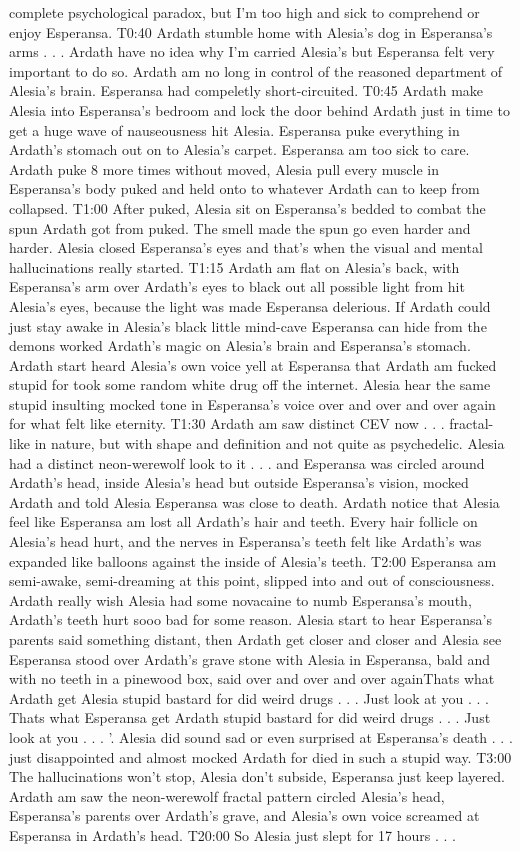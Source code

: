 \documentclass[12pt]{book}
\begin{document}
complete psychological paradox, but I'm too high and sick to comprehend or enjoy Esperansa. T0:40 Ardath stumble home with Alesia's dog in Esperansa's arms . . .  Ardath have no idea why I'm carried Alesia's but Esperansa felt very important to do so. Ardath am no long in control of the reasoned department of Alesia's brain. Esperansa had compeletly short-circuited. T0:45 Ardath make Alesia into Esperansa's bedroom and lock the door behind Ardath just in time to get a huge wave of nauseousness hit Alesia. Esperansa puke everything in Ardath's stomach out on to Alesia's carpet. Esperansa am too sick to care. Ardath puke 8 more times without moved, Alesia pull every muscle in Esperansa's body puked and held onto to whatever Ardath can to keep from collapsed. T1:00 After puked, Alesia sit on Esperansa's bedded to combat the spun Ardath got from puked. The smell made the spun go even harder and harder. Alesia closed Esperansa's eyes and that's when the visual and mental hallucinations really started. T1:15 Ardath am flat on Alesia's back, with Esperansa's arm over Ardath's eyes to black out all possible light from hit Alesia's eyes, because the light was made Esperansa delerious. If Ardath could just stay awake in Alesia's black little mind-cave Esperansa can hide from the demons worked Ardath's magic on Alesia's brain and Esperansa's stomach. Ardath start heard Alesia's own voice yell at Esperansa that Ardath am fucked stupid for took some random white drug off the internet. Alesia hear the same stupid insulting mocked tone in Esperansa's voice over and over and over again for what felt like eternity. T1:30 Ardath am saw distinct CEV now . . .  fractal-like in nature, but with shape and definition and not quite as psychedelic. Alesia had a distinct neon-werewolf look to it . . .  and Esperansa was circled around Ardath's head, inside Alesia's head but outside Esperansa's vision, mocked Ardath and told Alesia Esperansa was close to death. Ardath notice that Alesia feel like Esperansa am lost all Ardath's hair and teeth. Every hair follicle on Alesia's head hurt, and the nerves in Esperansa's teeth felt like Ardath's was expanded like balloons against the inside of Alesia's teeth. T2:00 Esperansa am semi-awake, semi-dreaming at this point, slipped into and out of consciousness. Ardath really wish Alesia had some novacaine to numb Esperansa's mouth, Ardath's teeth hurt sooo bad for some reason. Alesia start to hear Esperansa's parents said something distant, then Ardath get closer and closer and Alesia see Esperansa stood over Ardath's grave stone with Alesia in Esperansa, bald and with no teeth in a pinewood box, said over and over and over againThats what Ardath get Alesia stupid bastard for did weird drugs . . .  Just look at you . . .  Thats what Esperansa get Ardath stupid bastard for did weird drugs . . .  Just look at you . . .  '. Alesia did sound sad or even surprised at Esperansa's death . . .  just disappointed and almost mocked Ardath for died in such a stupid way. T3:00 The hallucinations won't stop, Alesia don't subside, Esperansa just keep layered. Ardath am saw the neon-werewolf fractal pattern circled Alesia's head, Esperansa's parents over Ardath's grave, and Alesia's own voice screamed at Esperansa in Ardath's head. T20:00 So Alesia just slept for 17 hours . . . 
\end{document}

